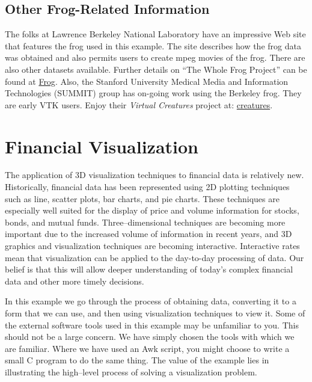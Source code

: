 \subsection{Other Frog-Related Information}

The folks at Lawrence Berkeley National Laboratory have an impressive Web site that features the frog used in this example. The site describes how the frog data was obtained and also permits users to create mpeg movies of the frog. There are also other datasets available. Further details on ``The Whole Frog Project'' can be found at \href{http://www-itg.lbl.gov/Frog}{Frog}. Also, the Stanford University Medical Media and Information Technologies (SUMMIT) group has on-going work using the Berkeley frog. They are early VTK users. Enjoy their \emph{Virtual Creatures} project at: \href{http://summit.stanford.edu/creatures}{creatures}.

\section{Financial Visualization}

The application of 3D visualization techniques to financial data is relatively new. Historically, financial data has been represented using 2D plotting techniques such as line, scatter plots, bar charts, and pie charts. These techniques are especially well suited for the display of price and volume information for stocks, bonds, and mutual funds. Three--dimensional techniques are becoming more important due to the increased volume of information in recent years, and 3D graphics and visualization techniques are becoming interactive. Interactive rates mean that visualization can be applied to the day-to-day processing of data. Our belief is that this will allow deeper understanding of today's complex financial data and other more timely decisions.

In this example we go through the process of obtaining data, converting it to a form that we can use, and then using visualization techniques to view it. Some of the external software tools used in this example may be unfamiliar to you. This should not be a large concern. We have simply chosen the tools with which we are familiar. Where we have used an Awk script, you might choose to write a small C program to do the same thing. The value of the example lies in illustrating the high--level process of solving a visualization problem.

